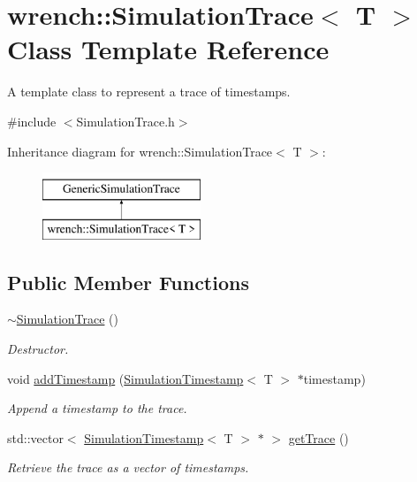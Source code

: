\hypertarget{classwrench_1_1_simulation_trace}{}\section{wrench\+:\+:Simulation\+Trace$<$ T $>$ Class Template Reference}
\label{classwrench_1_1_simulation_trace}


A template class to represent a trace of timestamps.  




{\ttfamily \#include $<$Simulation\+Trace.\+h$>$}

Inheritance diagram for wrench\+:\+:Simulation\+Trace$<$ T $>$\+:\begin{figure}[H]
\begin{center}
\leavevmode
\includegraphics[height=2.000000cm]{classwrench_1_1_simulation_trace}
\end{center}
\end{figure}
\subsection*{Public Member Functions}
\begin{DoxyCompactItemize}
\item 
\mbox{\label{classwrench_1_1_simulation_trace_a588924b771cc7ca089ba06e4a0e62c66}} 
\hyperlink{classwrench_1_1_simulation_trace_a588924b771cc7ca089ba06e4a0e62c66}{$\sim$\+Simulation\+Trace} ()
\begin{DoxyCompactList}\small\item\em Destructor. \end{DoxyCompactList}\item 
void \hyperlink{classwrench_1_1_simulation_trace_a95e17346a956bc157a6aaec1add38bdc}{add\+Timestamp} (\hyperlink{classwrench_1_1_simulation_timestamp}{Simulation\+Timestamp}$<$ T $>$ $\ast$timestamp)
\begin{DoxyCompactList}\small\item\em Append a timestamp to the trace. \end{DoxyCompactList}\item 
std\+::vector$<$ \hyperlink{classwrench_1_1_simulation_timestamp}{Simulation\+Timestamp}$<$ T $>$ $\ast$ $>$ \hyperlink{classwrench_1_1_simulation_trace_a577ad7d82202763c62f0fda28ca8bc56}{get\+Trace} ()
\begin{DoxyCompactList}\small\item\em Retrieve the trace as a vector of timestamps. \end{DoxyCompactList}\end{DoxyCompactItemize}


